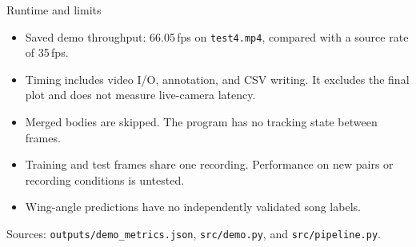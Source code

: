 \documentclass[aspectratio=169,11pt]{beamer}
\begin{document}
\begin{frame}{Runtime and limits}
\begin{itemize}
\item Saved demo throughput: 66.05\,fps on \texttt{test4.mp4}, compared with a source rate of 35\,fps.
\item Timing includes video I/O, annotation, and CSV writing. It excludes the final plot and does not measure live-camera latency.
\item Merged bodies are skipped. The program has no tracking state between frames.
\item Training and test frames share one recording. Performance on new pairs or recording conditions is untested.
\item Wing-angle predictions have no independently validated song labels.
\end{itemize}
\vspace{0.5em}
{\scriptsize Sources: \texttt{outputs/demo\_metrics.json}, \texttt{src/demo.py}, and \texttt{src/pipeline.py}.}
\end{frame}
\end{document}
